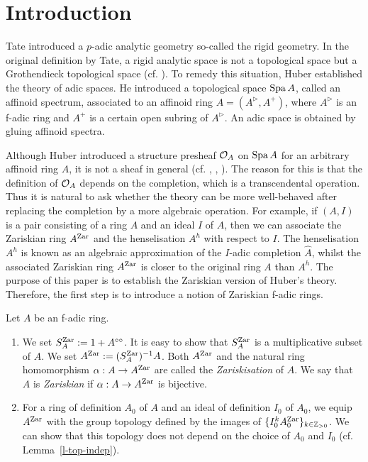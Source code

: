 \section{Introduction}


Tate introduced a $p$-adic analytic geometry 
so-called the rigid geometry. 
In the original definition by Tate, 
a rigid analytic space is not a topological space but 
a Grothendieck topological space (cf. \cite{BGR84}). 
To remedy this situation, 
Huber established the theory of adic spaces. 
He introduced a topological space ${\operatorname{Spa}}\,A$, 
called an affinoid spectrum, associated to an affinoid ring $A=(A^{\rhd}, A^+)$, 
where $A^{\rhd}$ is an f-adic ring and 
$A^+$ is a certain open subring of $A^{\rhd}$. 
An adic space is obtained by gluing affinoid spectra. 

Although Huber introduced a structure presheaf $\mathcal{O}_A$ 
on ${\operatorname{Spa}}\,A$ for an arbitrary affinoid ring $A$, 
it is not a sheaf in general 
(cf. \cite{BV}, \cite[the example after Proposition 1.6]{Hub94}, \cite{Mih16}). 
The reason for this is that 
the definition of $\mathcal{O}_A$ depends on the completion, 
which is a transcendental operation. 
Thus it is natural to ask whether 
the theory can be more well-behaved 
after replacing the completion by a more algebraic operation. 
For example, if $(A, I)$ is a pair consisting of a ring $A$ and an ideal $I$ of $A$, 
then we can associate the Zariskian ring $A^{{\operatorname{Zar}}}$ and 
the henselisation $A^h$ with respect to $I$. 
The henselisation $A^h$ is known as an algebraic approximation of the $I$-adic completion $\widehat{A}$, 
whilst the associated Zariskian ring $A^{{\operatorname{Zar}}}$ is closer to the original ring $A$ than $A^h$. 
The purpose of this paper is to establish the Zariskian version 
of Huber's theory. 
Therefore, the first step is to introduce a notion of Zariskian f-adic rings. 

\begin{dfn}\label{intro-d-zar}
Let $A$ be an f-adic ring. 
\begin{enumerate}
\item 
We set $S_A^{{\operatorname{Zar}}}:=1+A^{\circ\circ}$. 
It is easy to show that $S_A^{{\operatorname{Zar}}}$ is a multiplicative subset of $A$. 
We set $A^{{\operatorname{Zar}}}:=(S_A^{{\operatorname{Zar}}})^{-1}A$. 
Both $A^{{\operatorname{Zar}}}$ and the natural ring homomorphism $\alpha:A \to A^{{\operatorname{Zar}}}$ 
are called the {\em Zariskisation} of $A$. 
We say that $A$ is {\em Zariskian} if $\alpha:A \to A^{{\operatorname{Zar}}}$ 
is bijective. 
\item 
For a ring of definition $A_0$ of $A$ and 
an ideal of definition $I_0$ of $A_0$, 
we equip $A^{{\operatorname{Zar}}}$ with the group topology 
defined by the images of $\{I_0^kA_0^{{\operatorname{Zar}}}\}_{k\in \mathbb{Z}_{>0}}$. 
We can show that 
this topology does not depend on the choice of $A_0$ and $I_0$ 
(cf. Lemma~\ref{l-top-indep}). 
\end{enumerate}
\end{dfn}

